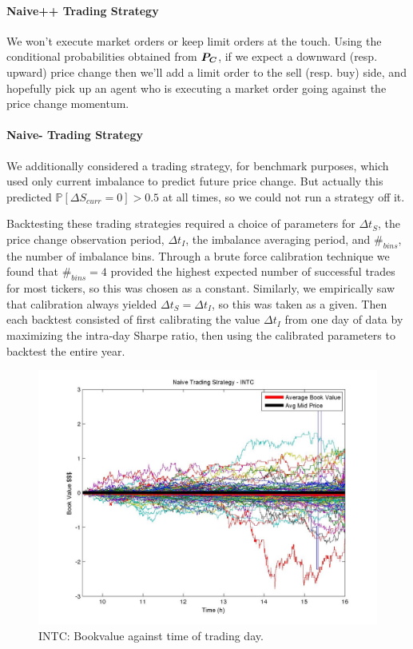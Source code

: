 \paragraph{Naive++ Trading Strategy} We won't execute market orders or keep limit orders at the touch. Using the conditional probabilities obtained from $\boldsymbol{P_C}$, if we expect a downward (resp. upward) price change then we'll add a limit order to the sell (resp. buy) side, and hopefully pick up an agent who is executing a market order going against the price change momentum. 

\paragraph{Naive- Trading Strategy} We additionally considered a trading strategy, for benchmark purposes, which used only current imbalance to predict future price change. But actually this predicted $\mathbb{P} \left[ \Delta S_{curr} = 0 \right] > 0.5$ at all times, so we could not run a strategy off it.

Backtesting these trading strategies required a choice of parameters for $\Delta t_S$, the price change observation period, $\Delta t_I$, the imbalance averaging period, and $\#_{bins}$, the number of imbalance bins. Through a brute force calibration technique we found that $\#_{bins} = 4$ provided the highest expected number of successful trades for most tickers, so this was chosen as a constant. Similarly, we empirically saw that calibration always yielded $\Delta t_S = \Delta t_I$, so this was taken as a given. Then each backtest consisted of first calibrating the value $\Delta t_I$ from one day of data by maximizing the intra-day Sharpe ratio, then using the calibrated parameters to backtest the entire year.

\begin{figure}
  \includegraphics[width=\textwidth]{Figs/fig-INTC-year-bookvals}
  \caption{INTC: Bookvalue against time of trading day.}
\end{figure}

